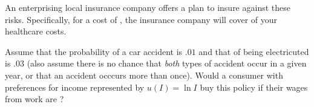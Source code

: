 \documentclass{article}
\begin{document}
An enterprising local insurance company offers a plan to insure against these risks. Specifically, for a cost of , the insurance company will cover  of your healthcare costs.

Assume that the probability of a car accident is $.01$ and that of being electricuted is $.03$ (also assume there is no chance that \textit{both} types of accident occur in a given year, or that an accident occcurs more than once). Would a consumer with preferences for income represented by $u(I) = \ln I$ buy this policy if their wages from work are ?
\end{document}
